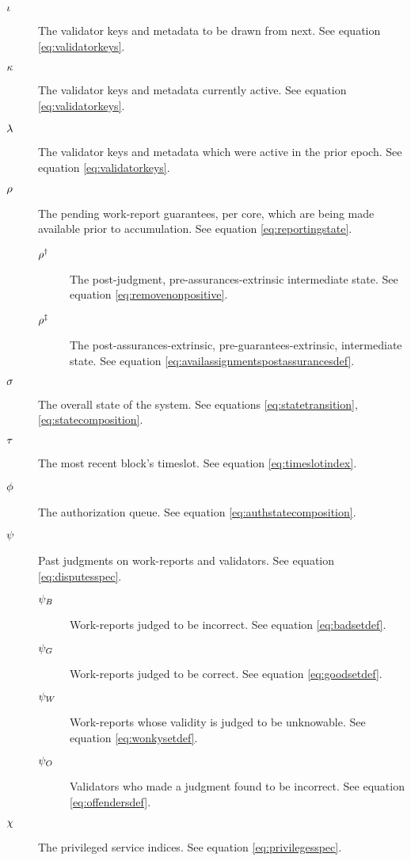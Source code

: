 \begin{description}
  \item[$\iota$] The validator keys and metadata to be drawn from next. See equation \ref{eq:validatorkeys}.
  \item[$\kappa$] The validator keys and metadata currently active. See equation \ref{eq:validatorkeys}.
  \item[$\lambda$] The validator keys and metadata which were active in the prior epoch. See equation \ref{eq:validatorkeys}.
  \item[$\rho$] The pending work-report guarantees, per core, which are being made available prior to accumulation. See equation \ref{eq:reportingstate}.
  \begin{description}
    \item[$\rho^\dagger$] The post-judgment, pre-assurances-extrinsic intermediate state. See equation \ref{eq:removenonpositive}.
    \item[$\rho^\ddagger$] The post-assurances-extrinsic, pre-guarantees-extrinsic, intermediate state. See equation \ref{eq:availassignmentspostassurancesdef}.
  \end{description}
  \item[$\sigma$] The overall state of the system. See equations \ref{eq:statetransition}, \ref{eq:statecomposition}.
  \item[$\tau$] The most recent block's timeslot. See equation \ref{eq:timeslotindex}.
  \item[$\phi$] The authorization queue. See equation \ref{eq:authstatecomposition}.
  \item[$\psi$] Past judgments on work-reports and validators. See equation \ref{eq:disputesspec}.
  \begin{description}
    \item[$\psi_B$] Work-reports judged to be incorrect. See equation \ref{eq:badsetdef}.
    \item[$\psi_G$] Work-reports judged to be correct. See equation \ref{eq:goodsetdef}.
    \item[$\psi_W$] Work-reports whose validity is judged to be unknowable. See equation \ref{eq:wonkysetdef}.
    \item[$\psi_O$] Validators who made a judgment found to be incorrect. See equation \ref{eq:offendersdef}.
  \end{description}
  \item[$\chi$] The privileged service indices. See equation \ref{eq:privilegesspec}.

\end{description}
